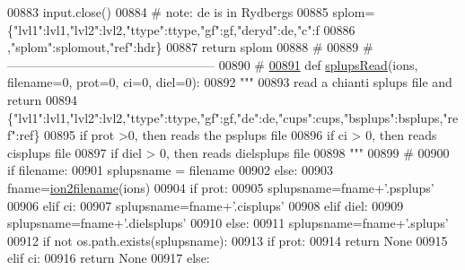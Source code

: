 \begin{DoxyCode}
{{{{{{{{{{{{00883     input.close()
00884     \textcolor{comment}{# note:  de is in Rydbergs}
00885     splom=\{\textcolor{stringliteral}{"lvl1"}:lvl1,\textcolor{stringliteral}{"lvl2"}:lvl2,\textcolor{stringliteral}{"ttype"}:ttype,\textcolor{stringliteral}{"gf"}:gf,\textcolor{stringliteral}{"deryd"}:de,\textcolor{stringliteral}{"c"}:f
00886         ,\textcolor{stringliteral}{"splom"}:splomout,\textcolor{stringliteral}{"ref"}:hdr\}
00887     \textcolor{keywordflow}{return}  splom
00888     \textcolor{comment}{#}
00889     \textcolor{comment}{# --------------------------------------------------}
00890     \textcolor{comment}{#}
\hypertarget{__chianti__tools_8py_source_l00891}{}\hyperlink{namespacepyneb_1_1utils_1_1__chianti__tools_a6e5e0d51ad5dd162d51353c6d2e49d3b}{00891} \textcolor{keyword}{def }\hyperlink{namespacepyneb_1_1utils_1_1__chianti__tools_a6e5e0d51ad5dd162d51353c6d2e49d3b}{splupsRead}(ions, filename=0, prot=0, ci=0,  diel=0):
00892     \textcolor{stringliteral}{"""}
00893 \textcolor{stringliteral}{    read a chianti splups file and return}
00894 \textcolor{stringliteral}{    \{"lvl1":lvl1,"lvl2":lvl2,"ttype":ttype,"gf":gf,"de":de,"cups":cups,"bsplups":bsplups,"ref":ref\}}
00895 \textcolor{stringliteral}{    if prot >0, then reads the psplups file}
00896 \textcolor{stringliteral}{    if ci > 0, then reads cisplups file}
00897 \textcolor{stringliteral}{    if diel > 0, then reads dielsplups file}
00898 \textcolor{stringliteral}{    """}
00899     \textcolor{comment}{#}
00900     \textcolor{keywordflow}{if} filename:
00901         splupsname = filename
00902     \textcolor{keywordflow}{else}:
00903         fname=\hyperlink{namespacepyneb_1_1utils_1_1__chianti__tools_ad4bc7b577fd4c3819ceb00b0a444351b}{ion2filename}(ions)
00904         \textcolor{keywordflow}{if} prot:
00905             splupsname=fname+\textcolor{stringliteral}{'.psplups'}
00906         \textcolor{keywordflow}{elif} ci:
00907             splupsname=fname+\textcolor{stringliteral}{'.cisplups'}
00908         \textcolor{keywordflow}{elif} diel:
00909             splupsname=fname+\textcolor{stringliteral}{'.dielsplups'}
00910         \textcolor{keywordflow}{else}:
00911             splupsname=fname+\textcolor{stringliteral}{'.splups'}
00912     \textcolor{keywordflow}{if} \textcolor{keywordflow}{not} os.path.exists(splupsname):
00913         \textcolor{keywordflow}{if} prot:
00914             \textcolor{keywordflow}{return} \textcolor{keywordtype}{None}
00915         \textcolor{keywordflow}{elif} ci:
00916             \textcolor{keywordflow}{return} \textcolor{keywordtype}{None}
00917         \textcolor{keywordflow}{else}:
}}}}}}}}}}}}
\end{DoxyCode}
